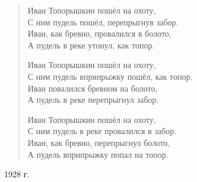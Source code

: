 \begin{verse}
Иван Топорышкин пошёл на охоту, \\
С ним пудель пошёл, перепрыгнув забор. \\
Иван, как бревно, провалился в болото, \\
А пудель в реке утонул, как топор.

Иван Топорышкин пошёл на охоту, \\
С ним пудель вприпрыжку пошёл, как топор. \\
Иван повалился бревном на болото, \\
А пудель в реке перепрыгнул забор.

Иван Топорышкин пошёл на охоту, \\
С ним пудель в реке провалился в забор. \\
Иван, как бревно, перепрыгнул болото, \\
А пудель вприпрыжку попал на топор.
\end{verse}

\begin{flushright}
1928 г.
\end{flushright}
